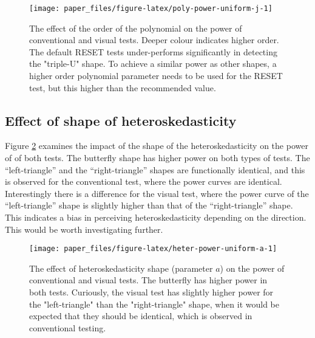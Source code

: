 \documentclass[]{interact}
\theoremstyle{plain}%
\theoremstyle{definition}
\theoremstyle{remark}
\begin{document}
\begin{figure}

{\centering \texttt{[image: paper\_files/figure-latex/poly-power-uniform-j-1]} 

}

\caption{The effect of the order of the polynomial on the power of conventional and visual tests. Deeper colour indicates higher order. The default RESET tests under-performs significantly in detecting the "triple-U" shape. To achieve a similar power as other shapes, a higher order polynomial parameter needs to be used for the RESET test, but this higher than the recommended value.}\label{fig:poly-power-uniform-j}
\end{figure}

\hypertarget{effect-of-shape-of-heteroskedasticity}{%
\subsection{\texorpdfstring{Effect of shape of
heteroskedasticity\label{hetero-analysis}}{Effect of shape of heteroskedasticity}}\label{effect-of-shape-of-heteroskedasticity}}

Figure \ref{fig:heter-power-uniform-a} examines the impact of the shape
of the heteroskedasticity on the power of of both tests. The butterfly
shape has higher power on both types of tests. The ``left-triangle'' and
the ``right-triangle'' shapes are functionally identical, and this is
observed for the conventional test, where the power curves are
identical. Interestingly there is a difference for the visual test,
where the power curve of the ``left-triangle'' shape is slightly higher
than that of the ``right-triangle'' shape. This indicates a bias in
perceiving heteroskedasticity depending on the direction. This would be
worth investigating further.

\begin{figure}

{\centering \texttt{[image: paper\_files/figure-latex/heter-power-uniform-a-1]} 

}

\caption{The effect of heteroskedasticity shape (parameter $a$) on the power of conventional and visual tests. The butterfly has higher power in both tests. Curiously, the visual test has slightly higher power for the "left-triangle" than the "right-triangle" shape, when it would be expected that they should be identical, which is observed in conventional testing.}\label{fig:heter-power-uniform-a}
\end{figure}
\end{document}
